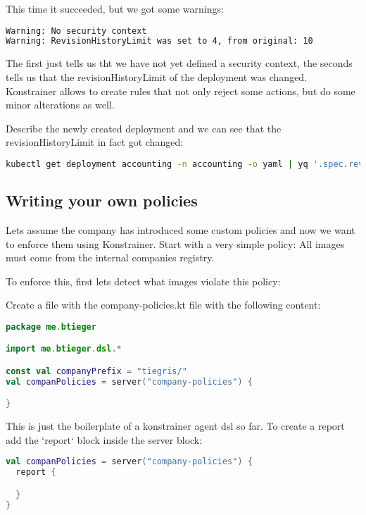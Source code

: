 This time it succeeded, but we got some warnings:

\begin{lstlisting}[caption={TODO},language=bash,label=code:todo]
Warning: No security context
Warning: RevisionHistoryLimit was set to 4, from original: 10
\end{lstlisting}

The first just tells us tht we have not yet defined a security context, the seconds tells us that the revisionHistoryLimit of the deployment was changed. Konstrainer allows to create rules that not only reject some actions, but do some minor alterations as well.

Describe the newly created deployment and we can see that the revisionHistoryLimit in fact got changed:

\begin{lstlisting}[caption={TODO},language=bash,label=code:bashx]
kubectl get deployment accounting -n accounting -o yaml | yq '.spec.revisionHistoryLimit'
\end{lstlisting}

\subsection{Writing your own policies}

Lets assume the company has introduced some custom policies and now we want to enforce them using Konstrainer. Start with a very simple policy: All images must come from the internal companies registry.

To enforce this, first lets detect what images violate this policy:

Create a file with the company-policies.kt file with the following content:

\begin{lstlisting}[caption={TODO},language=Kotlin,label=code:todo]
package me.btieger

import me.btieger.dsl.*

const val companyPrefix = "tiegris/"
val companPolicies = server("company-policies") {

}
\end{lstlisting}

This is just the boilerplate of a konstrainer agent dsl so far. To create a report add the `report` block inside the server block:

\begin{lstlisting}[caption={TODO},language=Kotlin,label=code:todo]
val companPolicies = server("company-policies") {
  report {

  }
}
\end{lstlisting}

